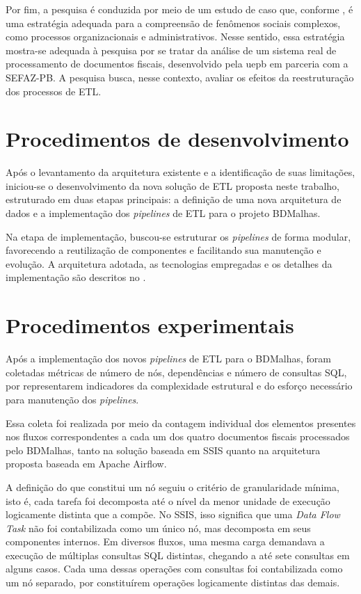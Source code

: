 Por fim, a pesquisa é conduzida por meio de um estudo de caso que, conforme , é uma estratégia 
adequada para a compreensão de fenômenos sociais complexos, como processos organizacionais e administrativos. 
Nesse sentido, essa estratégia mostra-se adequada à pesquisa por se tratar da análise de um sistema real de 
processamento de documentos fiscais, desenvolvido pela \gls{uepb} em
parceria com a SEFAZ-PB. A pesquisa busca, nesse contexto, avaliar os efeitos da reestruturação dos processos
de ETL.


\section{Procedimentos de desenvolvimento}

Após o levantamento da arquitetura existente e a identificação de suas limitações, iniciou-se o
desenvolvimento da nova solução de ETL proposta neste trabalho, estruturado em duas etapas
principais: a definição de uma nova arquitetura de dados e a implementação dos \textit{pipelines}
de ETL para o projeto BDMalhas.

Na etapa de implementação, buscou-se estruturar os \textit{pipelines} de forma modular, favorecendo
a reutilização de componentes e facilitando sua manutenção e evolução. A arquitetura adotada, as
tecnologias empregadas e os detalhes da implementação são descritos no .

\section{Procedimentos experimentais}
\label{sec:procedimentos_experimentais}

Após a implementação dos novos \textit{pipelines} de ETL para o BDMalhas, foram coletadas métricas de número de 
nós, dependências e número de consultas SQL, por representarem indicadores da complexidade estrutural e 
do esforço necessário para manutenção dos \textit{pipelines}.

Essa coleta foi realizada por meio da contagem individual dos elementos presentes nos fluxos correspondentes
a cada um dos quatro documentos fiscais processados pelo BDMalhas, tanto na solução baseada em SSIS quanto
na arquitetura proposta baseada em Apache Airflow.

A definição do que constitui um nó seguiu o critério de granularidade mínima, isto é, cada tarefa foi
decomposta até o nível da menor unidade de execução logicamente distinta que a compõe. No SSIS, isso
significa que uma \textit{Data Flow Task} não foi contabilizada como um único nó, mas decomposta em seus
componentes internos. Em diversos fluxos, uma mesma carga demandava a execução de múltiplas consultas SQL
distintas, chegando a até sete consultas em alguns casos. Cada uma dessas operações com consultas foi 
contabilizada como um nó separado, por constituírem operações logicamente distintas das demais.

